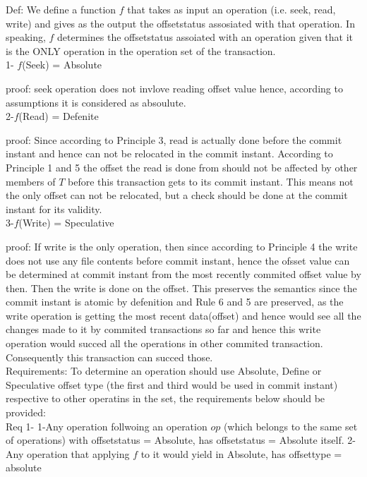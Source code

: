 \documentclass[a4paper, 11pt]{article}
\begin{document}
Def: We define a function $f$ that takes as input an operation (i.e. seek, read, write) and gives as the output the offsetstatus assosiated with that operation. In speaking, $f$ determines the offsetstatus assoiated with an operation given that it is the ONLY operation in the operation set of the transaction. \\

1- $f$(Seek) = Absolute 

proof: seek operation does not invlove reading offset value hence, according to assumptions it is considered as absoulute.\\

2-$f$(Read) = Defenite

proof: Since according to Principle 3, read is actually done before the commit instant and hence can not be relocated in the commit instant. According to Principle 1 and 5 the offset the read is done from should not be affected by other members of $T$ before this transaction gets to its commit instant. This means not the only offset can not be relocated, but a check should be done at the commit instant for its validity.\\

3-$f$(Write) = Speculative

proof: If write is the only operation, then since according to Principle 4 the write does not use any file contents before commit instant, hence the ofsset value can be determined at commit instant from the most recently commited offset value by then. Then the write is done on the offset. This preserves the semantics since the commit instant is atomic by defenition and Rule 6 and 5 are preserved, as the write operation is getting the most recent data(offset) and hence would see all the changes made to it by commited transactions so far and hence this write operation would succed all the operations in other commited transaction. Consequently this transaction can succed those.\\   

Requirements: To determine an operation should use Absolute, Define or Speculative offset type (the first and third would be used in commit instant) respective to other operatins in the set, the requirements below should be provided:\\

Req 1- 1-Any operation follwoing an operation $op$ (which belongs to the same set of operations) with offsetstatus = Absolute, has offsetstatus = Absolute itself. 2-Any operation that applying $f$ to it would yield in Absolute, has offsettype = absolute \\
\end{document}
